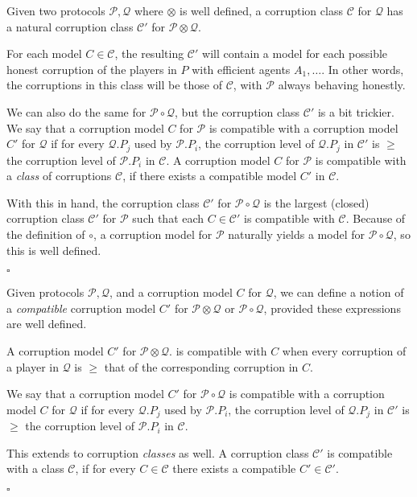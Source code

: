 \begin{definition}
\label{def:assoccc}
Given two protocols $\mathcal{P}, \mathcal{Q}$ where $\otimes$ is well
defined, a corruption class $\mathcal{C}$ for $\mathcal{Q}$ has a natural
corruption class $\mathcal{C}'$ for $\mathcal{P} \otimes \mathcal{Q}$.

For each model $C \in \mathcal{C}$, the resulting $\mathcal{C}'$ will
contain a model for each possible honest corruption of the players
in $P$ with efficient agents $A_1, \ldots$.
In other words, the corruptions in this class will be those of $\mathcal{C}$,
with $\mathcal{P}$ always behaving honestly.


We can also do the same for $\mathcal{P} \circ \mathcal{Q}$,
but the corruption class $\mathcal{C}'$ is a bit trickier.
We say that a corruption model $C$ for $\mathcal{P}$ is compatible with
a corruption model $C'$ for $\mathcal{Q}$ if for every
$\mathcal{Q}.P_j$ used by $\mathcal{P}.P_i$, the corruption
level of $\mathcal{Q}.P_j$ in $\mathcal{C}'$ is $\geq$ the corruption level of $\mathcal{P}.P_i$
in $\mathcal{C}$.
A corruption model $C$ for $\mathcal{P}$ is compatible
with a \emph{class} of corruptions $\mathcal{C}$, if
there exists a compatible model $C'$ in $\mathcal{C}$.

With this in hand, the corruption class $\mathcal{C}'$ for $\mathcal{P} \circ \mathcal{Q}$
is the largest (closed) corruption class $\mathcal{C}'$ for $\mathcal{P}$ such
that each $C \in \mathcal{C}'$ is compatible with $\mathcal{C}$.
Because of the definition of $\circ$, a corruption model
for $\mathcal{P}$ naturally yields a model for $\mathcal{P} \circ \mathcal{Q}$,
so this is well defined.


$\square$
\end{definition}

\begin{definition}
  Given protocols $\mathcal{P}, \mathcal{Q}$, and a corruption model
  $C$ for $\mathcal{Q}$, we can define a notion of a \emph{compatible}
  corruption model $C'$ for $\mathcal{P} \otimes \mathcal{Q}$ or $\mathcal{P} \circ \mathcal{Q}$,
  provided these expressions are well defined.

  A corruption model $C'$ for $\mathcal{P} \otimes \mathcal{Q}$.
  is compatible with $C$ when every corruption of a player
  in $\mathcal{Q}$ is $\geq$ that of the corresponding corruption in $C$.

  We say that a corruption model $C'$ for $\mathcal{P} \circ \mathcal{Q}$ is compatible with
a corruption model $C$ for $\mathcal{Q}$ if for every
$\mathcal{Q}.P_j$ used by $\mathcal{P}.P_i$, the corruption
level of $\mathcal{Q}.P_j$ in $\mathcal{C}'$ is $\geq$ the corruption level of $\mathcal{P}.P_i$
in $\mathcal{C}$.

  This extends to corruption \emph{classes} as well.
  A corruption class $\mathcal{C}'$ is compatible with a class $\mathcal{C}$,
  if for every $C \in \mathcal{C}$ there exists a compatible $C' \in \mathcal{C}'$.

  $\square$
\end{definition}

